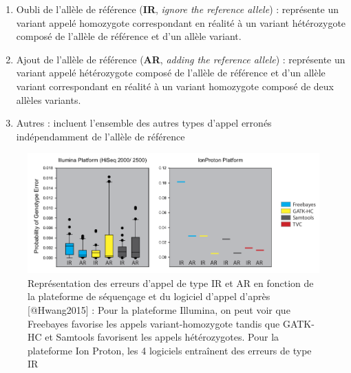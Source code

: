 \documentclass[12pt,twoside]{reedthesis}
\providecommand{\tightlist}{%
  \setlength{\itemsep}{0pt}\setlength{\parskip}{0pt}}
\theoremstyle{definition}
\theoremstyle{definition}
\theoremstyle{remark}
\begin{document}
  \begin{enumerate}
  \def\labelenumi{\arabic{enumi}.}
  \tightlist
  \item
    Oubli de l'allèle de référence (\textbf{IR}, \emph{ignore the
    reference allele}) : représente un variant appelé homozygote
    correspondant en réalité à un variant hétérozygote composé de l'allèle
    de référence et d'un allèle variant.\\
  \item
    Ajout de l'allèle de référence (\textbf{AR}, \emph{adding the
    reference allele}) : représente un variant appelé hétérozygote composé
    de l'allèle de référence et d'un allèle variant correspondant en
    réalité à un variant homozygote composé de deux allèles variants.\\
  \item
    Autres : incluent l'ensemble des autres types d'appel erronés
    indépendamment de l'allèle de référence
  \end{enumerate}
  
  \newpage
  
  \begin{figure}
  
  {\centering \includegraphics[scale=.50]{figure/snp_error_type} 
  
  }
  
  \caption[Représentation des erreurs d'appel de type IR et AR en fonction de la plateforme de séquençage et du logiciel d'appel]{Représentation des erreurs d'appel de type IR et AR en fonction de la plateforme de séquençage et du logiciel d'appel d'après [@Hwang2015] : Pour la plateforme Illumina, on peut voir que Freebayes favorise les appels variant-homozygote tandis que GATK-HC et Samtools favorisent les appels hétérozygotes. Pour la plateforme Ion Proton, les 4 logiciels entraînent des erreurs de type IR}\label{fig:snperror}
  \end{figure}
  
\end{document}
